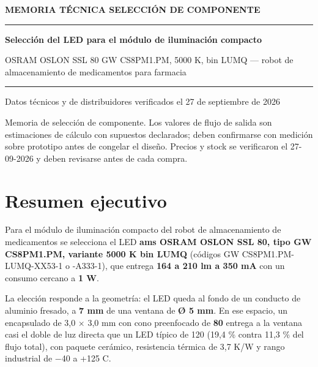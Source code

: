 \documentclass[11pt,a4paper]{article}
\begin{document}

\begin{titlepage}
\thispagestyle{empty}
\setlength{\parindent}{0pt}\raggedright
\vspace*{3cm}
{\sffamily\footnotesize\bfseries\color{navy}\MakeUppercase{Memoria técnica \textperiodcentered{} Selección de componente}\par}
\vspace{8pt}
{\color{navy}\rule{\linewidth}{2.5pt}}
\vspace{22pt}

{\sffamily\huge\bfseries Selección del LED para el módulo de iluminación compacto\par}
\vspace{14pt}
{\sffamily\large\color{gray2} OSRAM OSLON SSL 80 \textperiodcentered{} GW CS8PM1.PM, 5000 K, bin LUMQ — robot de almacenamiento de medicamentos para farmacia\par}
\vspace{30pt}
{\color{rule2}\rule{0.35\linewidth}{0.6pt}\par}
\vspace{12pt}
{\normalsize Datos técnicos y de distribuidores verificados el 27 de septiembre de 2026\par}
\vfill
{\sffamily\footnotesize\color{gray2}Memoria de selección de componente. Los valores de flujo de salida son estimaciones de cálculo con supuestos declarados; deben confirmarse con medición sobre prototipo antes de congelar el diseño. Precios y stock se verificaron el 27-09-2026 y deben revisarse antes de cada compra.\par}
\end{titlepage}
\setcounter{page}{2}

\tableofcontents
\clearpage
{}

\clearpage

\section*{Resumen ejecutivo}

Para el módulo de iluminación compacto del robot de almacenamiento de medicamentos se selecciona el LED \textbf{ams OSRAM OSLON SSL 80, tipo GW CS8PM1.PM, variante 5000 K bin LUMQ} (códigos GW CS8PM1.PM-LUMQ-XX53-1 o -A333-1), que entrega \textbf{164 a 210 lm a 350 mA} con un consumo cercano a \textbf{1 W}.

La elección responde a la geometría: el LED queda al fondo de un conducto de aluminio fresado, a \textbf{7 mm} de una ventana de \textbf{Ø 5 mm}. En ese espacio, un encapsulado de 3,0 $\times$ 3,0 mm con cono preenfocado de \textbf{80\textdegree{}} entrega a la ventana casi el doble de luz directa que un LED típico de 120\textdegree{} (19,4 \% contra 11,3 \% del flujo total), con paquete cerámico, resistencia térmica de 3,7 K/W y rango industrial de $-$40 a +125 \textdegree{}C.
\end{document}
